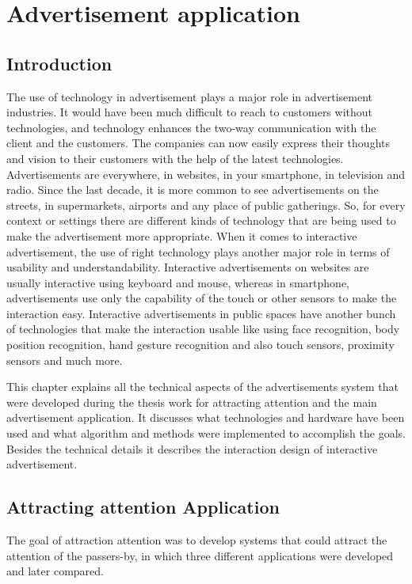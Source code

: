 \chapter{Advertisement application} %

\label{Chapter7} %
\newpage

\section{Introduction}
The use of technology in advertisement plays a major role in advertisement industries. It would have been much difficult to reach to customers without technologies, and technology enhances the two-way communication with the client and the customers. The companies can now easily express their thoughts and vision to their customers with the help of the latest technologies. Advertisements are everywhere, in websites, in your smartphone, in television and radio. Since the last decade, it is more common to see advertisements on the streets, in supermarkets, airports and any place of public gatherings.
So, for every context or settings there are different kinds of technology that are being used to make the advertisement more appropriate. When it comes to interactive advertisement, the use of right technology plays another major role in terms of usability and understandability. Interactive advertisements on websites are usually interactive using keyboard and mouse, whereas in smartphone, advertisements use only the capability of the touch or other sensors to make the interaction easy. Interactive advertisements in public spaces have another bunch of technologies that make the interaction usable like using face recognition, body position recognition, hand gesture recognition and also touch sensors, proximity sensors and much more.


This chapter explains all the technical aspects of the advertisements system that were developed during the thesis work for attracting attention and the main advertisement application. It discusses what technologies and hardware have been used and what algorithm and methods were implemented to accomplish the goals. Besides the technical details it describes the interaction design of interactive advertisement.



\iffalse
\section{Attracting attention Application}
The goal of attraction attention was to develop systems that could attract the attention of the passers-by, in which three different applications were developed and later compared.


